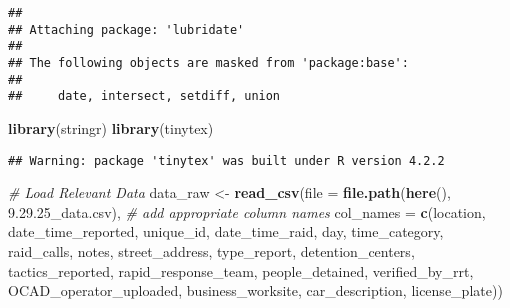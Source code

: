\documentclass[
]{article}
\newenvironment{Shaded}{\begin{snugshade}}{\end{snugshade}}
\newcommand{\AttributeTok}[1]{\textcolor[rgb]{0.13,0.29,0.53}{#1}}
\newcommand{\CommentTok}[1]{\textcolor[rgb]{0.56,0.35,0.01}{\textit{#1}}}
\newcommand{\FunctionTok}[1]{\textcolor[rgb]{0.13,0.29,0.53}{\textbf{#1}}}
\newcommand{\NormalTok}[1]{#1}
\newcommand{\OtherTok}[1]{\textcolor[rgb]{0.56,0.35,0.01}{#1}}
\newcommand{\StringTok}[1]{\textcolor[rgb]{0.31,0.60,0.02}{#1}}
\begin{document}
\begin{verbatim}
## 
## Attaching package: 'lubridate'
## 
## The following objects are masked from 'package:base':
## 
##     date, intersect, setdiff, union
\end{verbatim}

\begin{Shaded}
\begin{Highlighting}[]
\FunctionTok{library}\NormalTok{(stringr)}
\FunctionTok{library}\NormalTok{(tinytex)}
\end{Highlighting}
\end{Shaded}

\begin{verbatim}
## Warning: package 'tinytex' was built under R version 4.2.2
\end{verbatim}

\begin{Shaded}
\begin{Highlighting}[]
\CommentTok{\# Load Relevant Data }
\NormalTok{data\_raw }\OtherTok{\textless{}{-}} \FunctionTok{read\_csv}\NormalTok{(}\AttributeTok{file =} \FunctionTok{file.path}\NormalTok{(}\FunctionTok{here}\NormalTok{(), }\StringTok{\textquotesingle{}9.29.25\_data.csv\textquotesingle{}}\NormalTok{),}
                        \CommentTok{\# add appropriate column names}
                        \AttributeTok{col\_names =} \FunctionTok{c}\NormalTok{(}\StringTok{\textquotesingle{}location\textquotesingle{}}\NormalTok{, }\StringTok{\textquotesingle{}date\_time\_reported\textquotesingle{}}\NormalTok{,}
                                      \StringTok{\textquotesingle{}unique\_id\textquotesingle{}}\NormalTok{, }\StringTok{\textquotesingle{}date\_time\_raid\textquotesingle{}}\NormalTok{,}
                                      \StringTok{\textquotesingle{}day\textquotesingle{}}\NormalTok{, }\StringTok{\textquotesingle{}time\_category\textquotesingle{}}\NormalTok{, }
                                      \StringTok{\textquotesingle{}raid\_calls\textquotesingle{}}\NormalTok{, }\StringTok{\textquotesingle{}notes\textquotesingle{}}\NormalTok{,}
                                      \StringTok{\textquotesingle{}street\_address\textquotesingle{}}\NormalTok{, }\StringTok{\textquotesingle{}type\_report\textquotesingle{}}\NormalTok{,}
                                      \StringTok{\textquotesingle{}detention\_centers\textquotesingle{}}\NormalTok{, }\StringTok{\textquotesingle{}tactics\_reported\textquotesingle{}}\NormalTok{,}
                                      \StringTok{\textquotesingle{}rapid\_response\_team\textquotesingle{}}\NormalTok{, }\StringTok{\textquotesingle{}people\_detained\textquotesingle{}}\NormalTok{,}
                                      \StringTok{\textquotesingle{}verified\_by\_rrt\textquotesingle{}}\NormalTok{, }\StringTok{\textquotesingle{}OCAD\_operator\_uploaded\textquotesingle{}}\NormalTok{,}
                                      \StringTok{\textquotesingle{}business\_worksite\textquotesingle{}}\NormalTok{, }\StringTok{\textquotesingle{}car\_description\textquotesingle{}}\NormalTok{, }\StringTok{\textquotesingle{}license\_plate\textquotesingle{}}\NormalTok{)) }
\end{Highlighting}
\end{Shaded}
\end{document}

